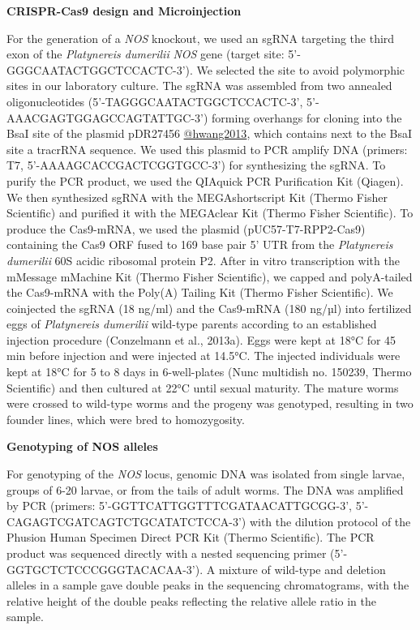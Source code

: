 \documentclass[
  10pt,
  onecolumn]{article}
\begin{document}
\textbf{CRISPR-Cas9 design and Microinjection}

For the generation of a \emph{NOS} knockout, we used an sgRNA targeting
the third exon of the \emph{Platynereis dumerilii} \emph{NOS} gene
(target site: 5'-GGGCAATACTGGCTCCACTC-3'). We selected the site to avoid
polymorphic sites in our laboratory culture. The sgRNA was assembled
from two annealed oligonucleotides (5'-TAGGGCAATACTGGCTCCACTC-3',
5'-AAACGAGTGGAGCCAGTATTGC-3') forming overhangs for cloning into the
BsaI site of the plasmid pDR27456 \href{42250,\%20Addgene}{@hwang2013},
which contains next to the BsaI site a tracrRNA sequence. We used this
plasmid to PCR amplify DNA (primers: T7, 5'-AAAAGCACCGACTCGGTGCC-3') for
synthesizing the sgRNA. To purify the PCR product, we used the QIAquick
PCR Purification Kit (Qiagen). We then synthesized sgRNA with the
MEGAshortscript Kit (Thermo Fisher Scientific) and purified it with the
MEGAclear Kit (Thermo Fisher Scientific). To produce the Cas9-mRNA, we
used the plasmid (pUC57-T7-RPP2-Cas9) containing the Cas9 ORF fused to
169 base pair 5' UTR from the \emph{Platynereis dumerilii} 60S acidic
ribosomal protein P2. After in vitro transcription with the mMessage
mMachine Kit (Thermo Fisher Scientific), we capped and polyA-tailed the
Cas9-mRNA with the Poly(A) Tailing Kit (Thermo Fisher Scientific). We
coinjected the sgRNA (18 ng/ml) and the Cas9-mRNA (180 ng/µl) into
fertilized eggs of \emph{Platynereis dumerilii} wild-type parents
according to an established injection procedure (Conzelmann et al.,
2013a). Eggs were kept at 18°C for 45 min before injection and were
injected at 14.5°C. The injected individuals were kept at 18°C for 5 to
8 days in 6-well-plates (Nunc multidish no. 150239, Thermo Scientific)
and then cultured at 22°C until sexual maturity. The mature worms were
crossed to wild-type worms and the progeny was genotyped, resulting in
two founder lines, which were bred to homozygosity.

\textbf{Genotyping of NOS alleles}

For genotyping of the \emph{NOS} locus, genomic DNA was isolated from
single larvae, groups of 6-20 larvae, or from the tails of adult worms.
The DNA was amplified by PCR (primers:
5'-GGTTCATTGGTTTCGATAACATTGCGG-3', 5'-CAGAGTCGATCAGTCTGCATATCTCCA-3')
with the dilution protocol of the Phusion Human Specimen Direct PCR Kit
(Thermo Scientific). The PCR product was sequenced directly with a
nested sequencing primer (5'-GGTGCTCTCCCGGGTACACAA-3'). A mixture of
wild-type and deletion alleles in a sample gave double peaks in the
sequencing chromatograms, with the relative height of the double peaks
reflecting the relative allele ratio in the sample.
\end{document}
